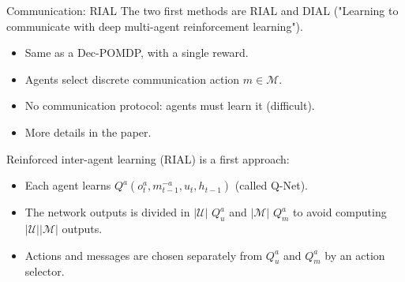 \documentclass[9pt, hyperref={pdfusetitle,colorlinks=true,allcolors=DarkBlue}]{beamer}
\begin{document}
\begin{frame}{Communication: RIAL}
The two first methods are RIAL and DIAL ("Learning to communicate with deep multi-agent reinforcement learning").

\begin{itemize}
    \item Same as a Dec-POMDP, with a single reward.
    \item Agents select discrete communication action $m \in \mathcal{M}$.
    \item No communication protocol: agents must learn it (difficult).
    \item More details in the paper.
\end{itemize}
\vfill
Reinforced inter-agent learning (RIAL) is a first approach:
\begin{itemize}
    \item Each agent learns $Q^a(o^a_t, m^{-a}_{t-1}, u_t, h_{t-1})$ (called Q-Net).
    \item The network outputs is divided in $|\mathcal{U}|$ $Q^a_u$ and $|\mathcal{M}|$ $Q^a_m$ to avoid computing $|\mathcal{U}||\mathcal{M}|$ outputs.
    \item Actions and messages are chosen separately from $Q^a_u$ and $Q^a_m$ by an action selector.
\end{itemize}
\end{frame}
\end{document}
